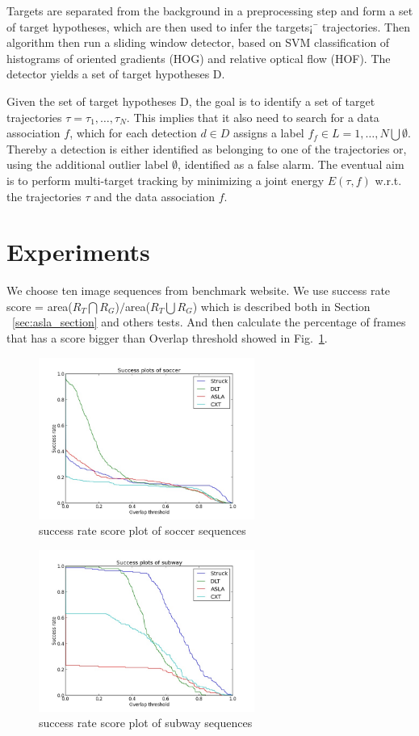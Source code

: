 \documentclass{acm_proc_article-sp}
\begin{document}
Targets are separated from the background in a preprocessing step and form a set of target hypotheses, which are then used to infer the targets¡¯ trajectories. Then algorithm then run a sliding window detector, based on SVM classification of histograms of oriented gradients (HOG) and relative optical flow (HOF). The detector yields a set of target hypotheses D.

Given the set of target hypotheses D, the goal is to identify a set of target trajectories $\tau = {\tau_1,\ldots,\tau_N}$. This implies that it also need to search for a data association $f$, which for each detection $d \in D$ assigns a label $f_f \in L = {1,\ldots,N}\bigcup \emptyset$. Thereby a detection is either identified as belonging to one of the trajectories or, using the additional outlier label $\emptyset$, identified as a false alarm.
The eventual aim is to perform multi-target tracking by minimizing a joint energy $E(\tau , f)$ w.r.t. the trajectories $\tau$ and the data association $f$. 

\section{Experiments}
We choose ten image sequences from benchmark website\cite{dataset}. We use success rate score = area($R_T \bigcap R_G$)$/$area($R_T \bigcup R_G$) which is described both in Section ~\ref{sec:asla_section} and others tests\cite{benchmark}. And then calculate the percentage of frames that has a score bigger than Overlap threshold showed in Fig.~\ref{fig:soccer}.

\begin{figure}[hbt]
    \includegraphics[width=200pt]{soccer.jpg}
    \caption{success rate score plot of soccer sequences}
    \label{fig:soccer}
\end{figure}

\begin{figure}[hbt]
    \includegraphics[width=200pt]{subway.jpg}
    \caption{success rate score plot of subway sequences}
    \label{fig:subway}
\end{figure}
\end{document}
